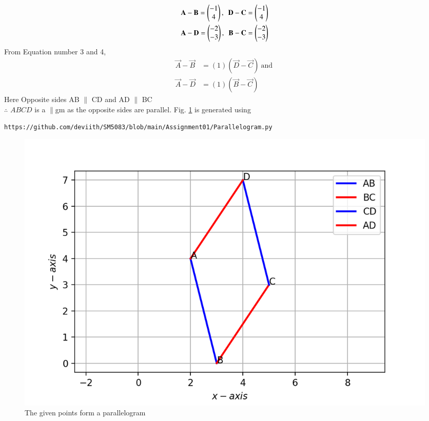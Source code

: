 \documentclass[journal,12pt,twocolumn]{IEEEtran}
\begin{document}
\begin{align}
\label{Equation :3}
\mathbf{A} - \mathbf{B} = \begin{pmatrix}-1\\4\end{pmatrix},~~
\mathbf{D} - \mathbf{C} = \begin{pmatrix}-1\\4\end{pmatrix}
\\
\mathbf {A} - \mathbf {D} = \begin{pmatrix}-2\\-3\end{pmatrix},~~
\mathbf {B} - \mathbf {C} =\begin{pmatrix}-2\\-3\end{pmatrix}
\label{Equation :4}
\end{align}
From Equation number 3 and 4,
\begin{align}
    \vec{A} - \vec{B} &= (1) ( \vec{D} - \vec{C} ) \nonumber
    ~\text{and}~\\
    \vec{A} - \vec{D}& = (1) ( \vec{B} - \vec{C} ) 
\end{align}
Here Opposite sides AB $\parallel$ CD and AD $\parallel$ BC \\
$\therefore$ $ABCD$ is a $\parallel$gm as the opposite sides are parallel.
%
\newline Fig. \ref{fig:parallelogram} is generated using 
\begin{lstlisting}
https://github.com/deviith/SM5083/blob/main/Assignment01/Parallelogram.py
\end{lstlisting}
\begin{figure}[!ht]
	\centering
	\includegraphics[width=\columnwidth]{Parallelogram.png}
	\caption{The given points form a parallelogram}
	\label{fig:parallelogram}
\end{figure}
\end{document}
